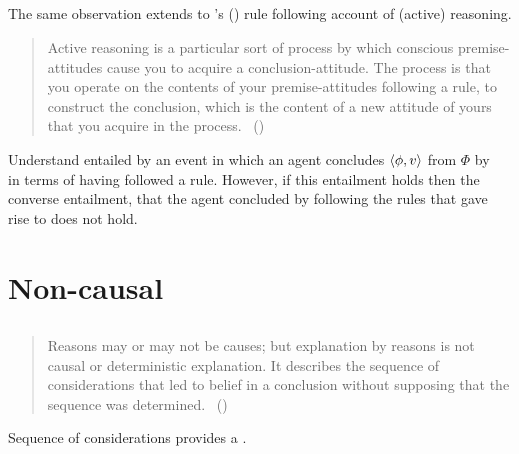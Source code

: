 \subsection*{\textcite{Broome:2002aa}}

\begin{note}
  The same observation extends to \citeauthor{Broome:2002aa}'s (\citeyear{Broome:2013aa}) rule following account of (active) reasoning.

  \begin{quote}
    Active reasoning is a particular sort of process by which conscious premise-attitudes cause you to acquire a conclusion-attitude.
    The process is that you operate on the contents of your premise-attitudes following a rule, to construct the conclusion, which is the content of a new attitude of yours that you acquire in the process.%
    \mbox{ }\hfill\mbox{(\citeyear[234]{Broome:2002aa})}
  \end{quote}

  Understand  entailed by an event in which an agent concludes \(\langle \phi, v \rangle\) from \(\Phi\) by~\supportI{} in terms of having followed a rule.
  However, if this entailment holds then the converse entailment, that the agent concluded by following the rules that gave rise to  does not hold.
\end{note}

\section{Non-causal}
\label{cha:lit:non-causal}

\subsection*{\textcite{Harman:1973ww}}

\begin{note}
  \begin{quote}
    Reasons may or may not be causes; but explanation by reasons is not causal or deterministic explanation.
    It describes the sequence of considerations that led to belief in a conclusion without supposing that the sequence was determined.%
    \mbox{ }\hfill\mbox{(\citeyear[52]{Harman:1973ww})}
  \end{quote}

  Sequence of considerations provides a \wit{}.
\end{note}

\subsection*{\textcite{Hieronymi:2011aa}}


